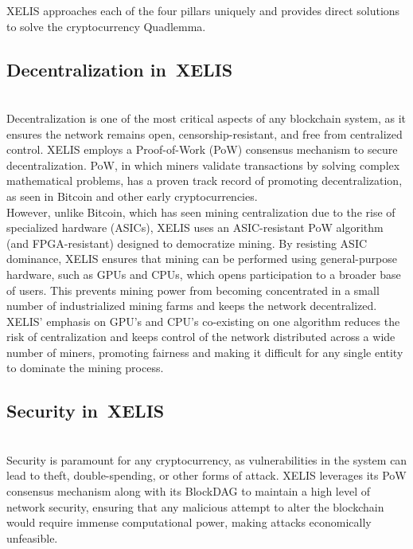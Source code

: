 \documentclass[10pt,a4paper,twocolumn]{article}
\begin{document}
XELIS approaches each of the four pillars uniquely and provides direct solutions to solve the cryptocurrency Quadlemma.\\


    \subsection{Decentralization in XELIS}\\

Decentralization is one of the most critical aspects of any blockchain system, as it ensures the network remains open, censorship-resistant, and free from centralized control. XELIS employs a Proof-of-Work (PoW) consensus mechanism to secure decentralization. PoW, in which miners validate transactions by solving complex mathematical problems, has a proven track record of promoting decentralization, as seen in Bitcoin and other early cryptocurrencies.\\

However, unlike Bitcoin, which has seen mining centralization due to the rise of specialized hardware (ASICs), XELIS uses an ASIC-resistant PoW algorithm (and FPGA-resistant) designed to democratize mining. By resisting ASIC dominance, XELIS ensures that mining can be performed using general-purpose hardware, such as GPUs and CPUs, which opens participation to a broader base of users. This prevents mining power from becoming concentrated in a small number of industrialized mining farms and keeps the network decentralized.\\

XELIS' emphasis on GPU's and CPU's co-existing on one algorithm reduces the risk of centralization and keeps control of the network distributed across a wide number of miners, promoting fairness and making it difficult for any single entity to dominate the mining process.\\

\subsection{Security in XELIS}\\

Security is paramount for any cryptocurrency, as vulnerabilities in the system can lead to theft, double-spending, or other forms of attack. XELIS leverages its PoW consensus mechanism along with its BlockDAG to maintain a high level of network security, ensuring that any malicious attempt to alter the blockchain would require immense computational power, making attacks economically unfeasible.\\
\end{document}
